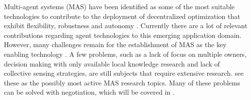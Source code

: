 Multi-agent systems (MAS) have been identified as some of the most suitable technologies to contribute to the deployment of decentralized optimization that exhibit flexibility, robustness and autonomy \citep{vinyals2010survey}. Currently there are a lot of relevant contributions regarding agent technologies to this emerging application domain. However, many challenges remain for the establishment of MAS as the key enabling technology \citep{vinyals2010survey}. A few problems, such as a lack of focus on multiple owners, decision making with only available local knowledge research and lack of collective sensing strategies, are still subjects that require extensive research. \citet{vinyals2010survey} see these as the possibly most active MAS research topics. Many of these problems can be solved with negotiation, which will be covered in .

